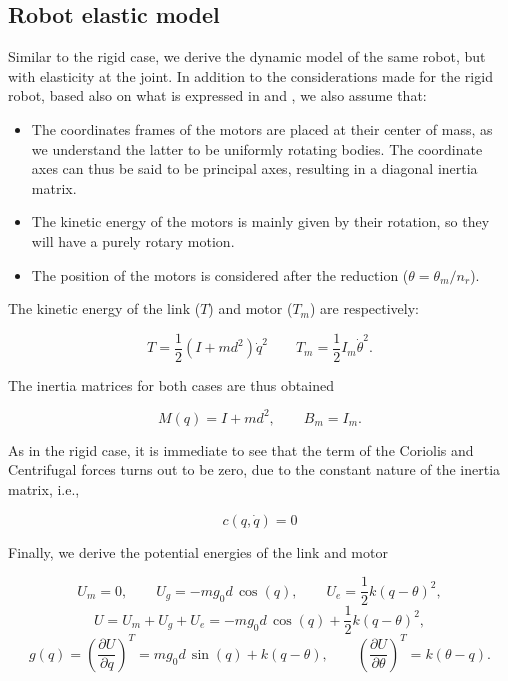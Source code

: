 \documentclass[a4paper]{article}
\begin{document}
\subsection{Robot elastic model}
Similar to the rigid case, we derive the dynamic model of the same robot, but with elasticity at the joint. In addition to the considerations made for the rigid robot, based also on what is expressed in \cite{sponge} and \cite{tomei}, we also assume that:

\begin{itemize}
    \item The coordinates frames of the motors are placed at their center of mass, as we understand the latter to be uniformly rotating bodies. The coordinate axes can thus be said to be principal axes, resulting in a diagonal inertia matrix.
    \item The kinetic energy of the motors is mainly given by their rotation, so they will have a purely rotary motion.
    \item The position of the motors is considered after the reduction ($\theta = \theta_m / n_r$). \\
\end{itemize}

The kinetic energy of the link ($T$) and motor ($T_m$) are respectively:

\begin{equation}
    \nonumber
    T = \frac{1}{2} (I + md^2)\dot{q}^2 \qquad T_m = \frac{1}{2} I_m \dot{\theta}^2.
\end{equation}

The inertia matrices for both cases are thus obtained

\begin{equation}
    \nonumber
    M(q) = I + md^2, \qquad B_m = I_m.
\end{equation}

As in the rigid case, it is immediate to see that the term of the Coriolis and Centrifugal forces turns out to be zero, due to the constant nature of the inertia matrix, i.e.,

\begin{equation}
    \nonumber
    c(q,\dot{q}) = 0
\end{equation}

Finally, we derive the potential energies of the link and motor

\begin{equation}
    \nonumber
    U_m = 0, \qquad U_g = -mg_0d\, \cos(q), \qquad U_e = \frac{1}{2} k(q-\theta)^2,
\end{equation}
\begin{equation}
    \nonumber
    U = U_m + U_g + U_e = -mg_0d\, \cos(q) + \frac{1}{2}k(q-\theta)^2,
\end{equation}
\begin{equation}
    \nonumber
    g(q) = \left(\frac{\partial U}{\partial q}\right)^T = mg_0d\, \sin(q) +k(q-\theta),\qquad \left(\frac{\partial U}{\partial \theta}\right)^T = k(\theta - q).
\end{equation}
\end{document}
